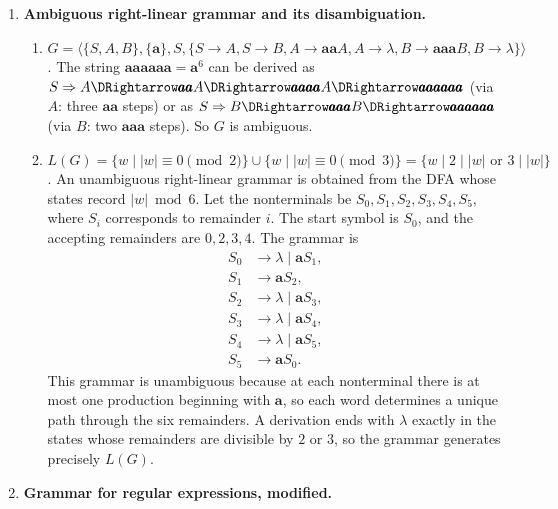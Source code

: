 \begin{enumerate}[{9.}1. ]
\textbf{Grammar}: $S \to \pmb{a}S\pmb{c} \mid T$, $T \to \pmb{b}T\pmb{c} \mid \lambda$.

\textbf{Proof}: Any derivation produces $\pmb{a}^i \cdot \pmb{b}^j\pmb{c}^j \cdot \pmb{c}^i = \pmb{a}^i\pmb{b}^j\pmb{c}^{i+j}$. Taking $k = i+j$, we get exactly the language. \qed

\item \textbf{Ambiguous right-linear grammar and its disambiguation.}

\begin{enumerate}
\item $G = \langle\{S,A,B\},\{\pmb{a}\},S,\{S\to A, S\to B, A\to\pmb{aa}A, A\to\lambda, B\to\pmb{aaa}B, B\to\lambda\}\rangle$.
The string $\pmb{aaaaaa} = \pmb{a}^6$ can be derived as $S\Rightarrow A \DRightarrow \pmb{aa}A\DRightarrow \pmb{aaaa}A\DRightarrow \pmb{aaaaaa}$ (via $A$: three $\pmb{aa}$ steps) or as $S \Rightarrow B \DRightarrow \pmb{aaa}B\DRightarrow\pmb{aaaaaa}$ (via $B$: two $\pmb{aaa}$ steps). So $G$ is ambiguous.

\item $L(G) = \{w \mid |w| \equiv 0 \pmod{2}\} \cup \{w \mid |w| \equiv 0 \pmod{3}\} = \{w \mid 2 \mid |w| \text{ or } 3 \mid |w|\}$.
An unambiguous right-linear grammar is obtained from the DFA whose states record
$|w|\bmod 6$.  Let the nonterminals be
$S_0,S_1,S_2,S_3,S_4,S_5$, where $S_i$ corresponds to remainder $i$.  The
start symbol is $S_0$, and the accepting remainders are $0,2,3,4$.  The grammar
is
\[
\begin{aligned}
S_0&\to \lambda\mid \pmb{a}S_1,\\
S_1&\to \pmb{a}S_2,\\
S_2&\to \lambda\mid \pmb{a}S_3,\\
S_3&\to \lambda\mid \pmb{a}S_4,\\
S_4&\to \lambda\mid \pmb{a}S_5,\\
S_5&\to \pmb{a}S_0.
\end{aligned}
\]
This grammar is unambiguous because at each nonterminal there is at most one
production beginning with $\pmb{a}$, so each word determines a unique path
through the six remainders.  A derivation ends with $\lambda$ exactly in the
states whose remainders are divisible by $2$ or $3$, so the grammar generates
precisely $L(G)$.
\end{enumerate}

\item \textbf{Grammar for regular expressions, modified.}


\end{enumerate}
